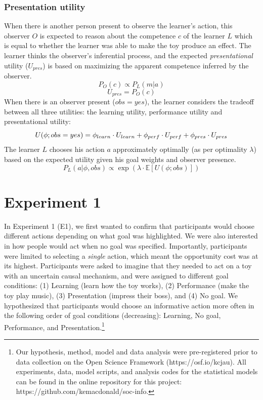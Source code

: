 \documentclass[10pt, letterpaper]{article}
\begin{document}
\subsubsection{Presentation utility}\label{presentation-utility}

When there is another person present to observe the learner's action,
this observer \(O\) is expected to reason about the competence \(c\) of
the learner \(L\) which is equal to whether the learner was able to make
the toy produce an effect. The learner thinks the observer's inferential
process, and the expected \emph{presentational} utility (\(U_{pres}\))
is based on maximizing the apparent competence inferred by the observer.
\[ P_O(c) \propto P_L(m | a)\] \[ U_{pres} = P_O(c)\] When there is an
observer present (\(obs = yes\)), the learner considers the tradeoff
between all three utilities: the learning utility, performance utility
and presentational utility:
\[ U(\phi; obs = yes) = \phi_{learn} \cdot U_{learn} + \\ \phi_{perf} \cdot U_{perf} + \phi_{pres} \cdot U_{pres}\]
The learner \(L\) chooses his action \(a\) approximately optimally (as
per optimality \(\lambda\)) based on the expected utility given his goal
weights and observer presence.
\[ P_L(a | \phi, obs) \propto \exp(\lambda \cdot \mathbb{E}[U(\phi; obs)])\]

\section{Experiment 1}\label{experiment-1}

In Experiment 1 (E1), we first wanted to confirm that participants would
choose different actions depending on what goal was highlighted. We were
also interested in how people would act when no goal was specified.
Importantly, participants were limited to selecting a \emph{single}
action, which meant the opportunity cost was at its highest.
Participants were asked to imagine that they needed to act on a toy with
an uncertain causal mechanism, and were assigned to different goal
conditions: (1) Learning (learn how the toy works), (2) Performance
(make the toy play music), (3) Presentation (impress their boss), and
(4) No goal. We hypothesized that participants would choose an
informative action more often in the following order of goal conditions
(decreasing): Learning, No goal, Performance, and
Presentation.\footnote{Our hypothesis, method, model and data analysis were pre-registered prior to data collection on the Open Science Framework (https://osf.io/kcjau). All experiments, data, model scripts, and analysis codes for the statistical models can be found in the online repository for this project: https://github.com/kemacdonald/soc-info.}
\end{document}
